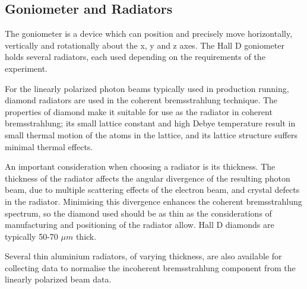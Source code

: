 \subsection{Goniometer and Radiators \label{sec:radiators}}
The goniometer is a device which can position and precisely move horizontally, vertically and rotationally about the x, y and z axes.
The Hall D goniometer holds several radiators, each used depending on the requirements of the experiment.

For the linearly polarized photon beams typically used in \GX{} production running, diamond radiators are used in the coherent bremsstrahlung technique.
The properties of diamond make it suitable for use as the radiator in coherent bremsstrahlung; its small lattice constant and high Debye temperature result in small thermal motion of the atoms in the lattice, and its lattice structure suffers minimal thermal effects.

An important consideration when choosing a radiator is its thickness. The thickness of the radiator affects the angular divergence of the resulting photon beam, due to multiple scattering effects of the electron beam, and crystal defects in the radiator.
Minimising this divergence enhances the coherent bremsstrahlung spectrum, so the diamond used should be as thin as the considerations of manufacturing and
positioning of the radiator allow.
Hall D diamonds are typically 50-70 $\mu m$ thick.



Several thin aluminium radiators, of varying thickness, are also available for collecting data to normalise the incoherent bremsstrahlung component from the linearly polarized beam data.

